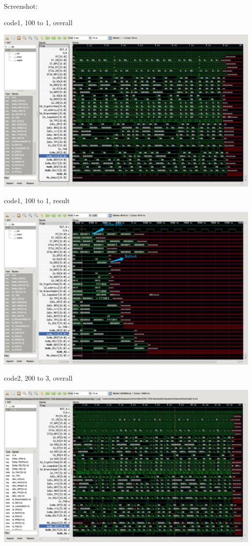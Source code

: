 \documentclass{article}
\begin{document}
\subsection{}
Screenshot:

code1, 100 to 1, overall

\includegraphics[width=\textwidth]{code1-1-0.png}

code1, 100 to 1, result

\includegraphics[width=\textwidth]{code1-1-1.png}

code2, 200 to 3, overall

\includegraphics[width=\textwidth]{code2-3-0.png}
\end{document}
